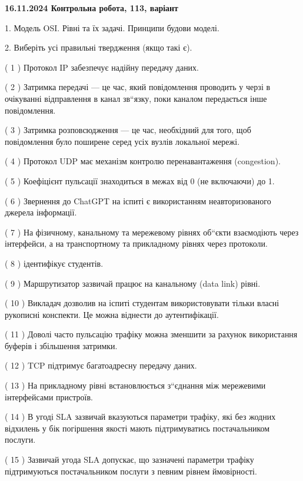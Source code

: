 \documentclass[12pt, ukrainian]{article}
\begin{document}
\vspace{4mm}
\newpage
\begin {large}

\textbf{16.11.2024 Контрольна робота, 113, варіант  }\par


{
1. Модель OSI. Рівні та їх задачі. Принципи будови моделі.



\vspace{5mm}
2. Виберіть усі правильні твердження (якщо такі є).\par
\vspace{2mm}

( 1 ) Протокол IP забезпечує надійну передачу даних.

( 2 ) Затримка передачі — це час, який повідомлення проводить у черзі в очікуванні відправлення в канал зв“язку, поки каналом передається інше повідомлення.

( 3 ) Затримка розповсюдження — це час, необхідний для того, щоб повідомлення було поширене серед усіх вузлів локальної мережі.

( 4 ) Протокол UDP має механізм контролю перенавантаження (congestion).

( 5 ) Коефіцієнт пульсації знаходиться в межах від 0 (не включаючи) до 1.

( 6 ) Звернення до ChatGPT на іспиті є використанням неавторизованого джерела інформації.

( 7 ) На фізичному, канальному та мережевому рівнях об“єкти взаємодіють через інтерфейси, а на транспортному та прикладному рівнях через протоколи.

( 8 ) ідентифікує студентів.

( 9 ) Маршрутизатор зазвичай працює на канальному (data link) рівні.

( 10 ) Викладач дозволив на іспиті студентам використовувати тільки власні рукописні конспекти. Це можна віднести до аутентифікації.

( 11 ) Доволі часто пульсацію трафіку можна зменшити за рахунок використання буферів і збільшення затримки.

( 12 ) TCP підтримує багатоадресну передачу даних.

( 13 ) На прикладному рівні встановлюється з“єднання між мережевими інтерфейсами пристроїв.

( 14 ) В угоді SLA зазвичай вказуються параметри трафіку, які без жодних відхилень у бік погіршення якості мають підтримуватись постачальником послуги.

( 15 ) Зазвичай угода  SLA допускає, що зазначені параметри трафіку підтримуються постачальником послуги з певним рівнем ймовірності.
}
\end {large}
\end{document}
